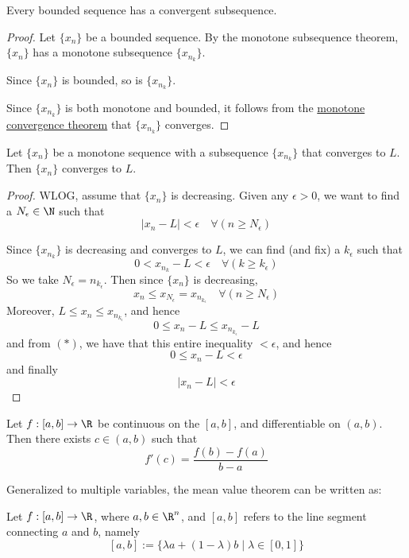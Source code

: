 \label{d277ad0}

Every bounded sequence has a convergent subsequence.

\begin{proof}
	\def\xn{\{x_n\}}
	\def\xnk{\{x_{n_k}\}}

	Let $\xn$ be a bounded sequence. By the monotone subsequence
	theorem, $\xn$ has a monotone subsequence $\xnk$.

	Since $\xn$ is bounded, so is $\xnk$.

	Since $\xnk$ is both monotone and bounded, it follows from the
	\href{ca25eb7}{monotone convergence theorem} that $\xnk$
	converges.
\end{proof}


\label{aaf3ba6}

Let $\{x_n\}$ be a monotone sequence with a subsequence $\{x_{n_k}\}$
that converges to $L$. Then $\{x_n\}$ converges to $L$.

\begin{proof}
	WLOG, assume that $\{x_n\}$ is decreasing.
	Given any $\epsilon>0$, we want to find a $N_\epsilon\in\N$ such that
	$$
		|x_n-L|<\epsilon\quad\forall(n\geq N_\epsilon)
	$$

	Since $\{x_{n_k}\}$ is decreasing and converges to $L$, we can find
	(and fix) a $k_\epsilon$ such that
	\begin{equation*}
		0<x_{n_k}-L<\epsilon\quad\forall(k\geq k_\epsilon)\tag*{($*$)}
	\end{equation*}
	So we take $N_\epsilon=n_{k_\epsilon}$. Then since $\{x_n\}$ is
	decreasing,
	$$
		x_n\leq x_{N_\epsilon}=x_{n_{k_\epsilon}}\quad\forall(n\geq N_\epsilon)
	$$
	Moreover, $L\leq x_n\leq x_{n_{k_\epsilon}}$, and hence
	$$0\leq x_n-L\leq x_{n_{k_\epsilon}}-L$$
	and from $(*)$, we have that this entire inequality $<\epsilon$, and hence
	$$0\leq x_n-L<\epsilon$$
	and finally
	$$|x_n-L|<\epsilon$$
\end{proof}

\label{d37aa2b}

Let $f:[a,b]\to\R$ be continuous on the $[a,b]$, and differentiable on
$(a,b)$. Then there exists $c\in(a,b)$ such that
$$
	f'(c)=\frac{f(b)-f(a)}{b-a}
$$

Generalized to multiple variables, the mean value theorem can be
written as:

Let $f:[a,b]\to\R$, where $a,b\in\R^n$, and $[a,b]$ refers to the line
segment connecting $a$ and $b$, namely
$$
	[a,b]:=\{\lambda a+(1-\lambda)b\mid\lambda\in[0,1]\}
$$

